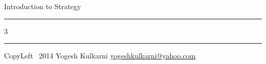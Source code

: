 \documentclass[8pt,landscape]{article}
\begin{document}
\begin{center}
     \Large{Introduction to Strategy}  %
\end{center}
\rule{\linewidth}{0.25pt}
\raggedright
\footnotesize
\begin{multicols}{3}


\rule{0.3\linewidth}{0.25pt}

\scriptsize
CopyLeft \textcopyleft\ 2014 Yogesh Kulkarni
\href{http://www.yogeshkulkarni.com}{yogeshkulkarni@yahoo.com}

\end{multicols}
\end{document}
